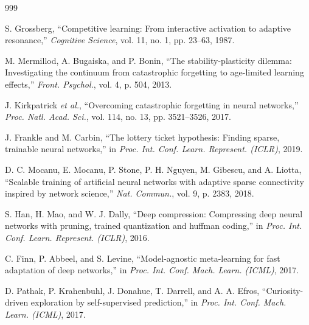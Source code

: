\documentclass[12pt,a4paper,oneside]{report}
\begin{document}
\begin{thebibliography}{999}

S. Grossberg, ``Competitive learning: From interactive activation to adaptive resonance,'' \textit{Cognitive Science}, vol. 11, no. 1, pp. 23--63, 1987.




M. Mermillod, A. Bugaiska, and P. Bonin, ``The stability-plasticity dilemma: Investigating the continuum from catastrophic forgetting to age-limited learning effects,'' \textit{Front. Psychol.}, vol. 4, p. 504, 2013.




J. Kirkpatrick \textit{et al.}, ``Overcoming catastrophic forgetting in neural networks,'' \textit{Proc. Natl. Acad. Sci.}, vol. 114, no. 13, pp. 3521--3526, 2017.




J. Frankle and M. Carbin, ``The lottery ticket hypothesis: Finding sparse, trainable neural networks,'' in \textit{Proc. Int. Conf. Learn. Represent. (ICLR)}, 2019.




D. C. Mocanu, E. Mocanu, P. Stone, P. H. Nguyen, M. Gibescu, and A. Liotta, ``Scalable training of artificial neural networks with adaptive sparse connectivity inspired by network science,'' \textit{Nat. Commun.}, vol. 9, p. 2383, 2018.




S. Han, H. Mao, and W. J. Dally, ``Deep compression: Compressing deep neural networks with pruning, trained quantization and huffman coding,'' in \textit{Proc. Int. Conf. Learn. Represent. (ICLR)}, 2016.




C. Finn, P. Abbeel, and S. Levine, ``Model-agnostic meta-learning for fast adaptation of deep networks,'' in \textit{Proc. Int. Conf. Mach. Learn. (ICML)}, 2017.




D. Pathak, P. Krahenbuhl, J. Donahue, T. Darrell, and A. A. Efros, ``Curiosity-driven exploration by self-supervised prediction,'' in \textit{Proc. Int. Conf. Mach. Learn. (ICML)}, 2017.












\end{thebibliography}
\end{document}
